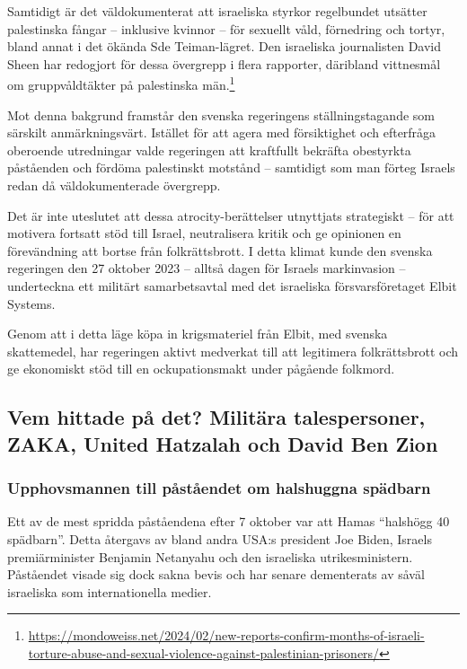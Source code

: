 \documentclass[12pt]{article}
\begin{document}
Samtidigt är det väldokumenterat att israeliska styrkor regelbundet utsätter palestinska fångar – inklusive kvinnor – för sexuellt våld, förnedring och tortyr, bland annat i det ökända Sde Teiman-lägret. Den israeliska journalisten David Sheen har redogjort för dessa övergrepp i flera rapporter, däribland vittnesmål om gruppvåldtäkter på palestinska män.\footnote{\url{https://mondoweiss.net/2024/02/new-reports-confirm-months-of-israeli-torture-abuse-and-sexual-violence-against-palestinian-prisoners/}}

Mot denna bakgrund framstår den svenska regeringens ställningstagande som särskilt anmärkningsvärt. Istället för att agera med försiktighet och efterfråga oberoende utredningar valde regeringen att kraftfullt bekräfta obestyrkta påståenden och fördöma palestinskt motstånd – samtidigt som man förteg Israels redan då väldokumenterade övergrepp.

Det är inte uteslutet att dessa atrocity-berättelser utnyttjats strategiskt – för att motivera fortsatt stöd till Israel, neutralisera kritik och ge opinionen en förevändning att bortse från folkrättsbrott. I detta klimat kunde den svenska regeringen den 27 oktober 2023 – alltså dagen för Israels markinvasion – underteckna ett militärt samarbetsavtal med det israeliska försvarsföretaget Elbit Systems.

Genom att i detta läge köpa in krigsmateriel från Elbit, med svenska skattemedel, har regeringen aktivt medverkat till att legitimera folkrättsbrott och ge ekonomiskt stöd till en ockupationsmakt under pågående folkmord.

\subsection*{Vem hittade på det? Militära talespersoner, ZAKA, United Hatzalah och David Ben Zion}
\subsubsection*{Upphovsmannen till påståendet om halshuggna spädbarn}

Ett av de mest spridda påståendena efter 7 oktober var att Hamas “halshögg 40 spädbarn”. Detta återgavs av bland andra USA:s president Joe Biden, Israels premiärminister Benjamin Netanyahu och den israeliska utrikesministern. Påståendet visade sig dock sakna bevis och har senare dementerats av såväl israeliska som internationella medier.
\end{document}
